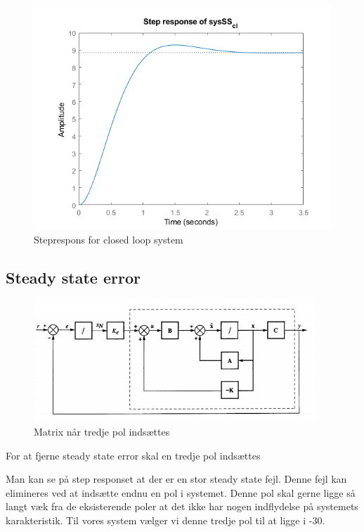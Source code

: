 \begin{figure}[H]
	\centering
	\includegraphics[width = 400pt]{Img/StepOfSysSS_cl.png}
	\caption{Steprespons for closed loop system}
	\label{fig:SteadyStateBlok}
\end{figure}

\subsection{Steady state error}

\begin{figure}[H]
	\centering
	\includegraphics[width = 300pt]{Img/SteadyState_blok.png}
	\caption{Matrix når tredje pol indsættes}
	\label{fig:SteadyStateMatrix}
\end{figure}
For at fjerne steady state error skal en tredje pol indsættes


Man kan se på step responset at der er en stor steady state fejl. Denne fejl kan elimineres ved at indsætte endnu en pol i systemet. Denne pol skal gerne ligge så langt væk fra de eksisterende poler at det ikke har nogen indflydelse på systemets karakteristik. Til vores system vælger vi denne tredje pol til at ligge i -30. 

